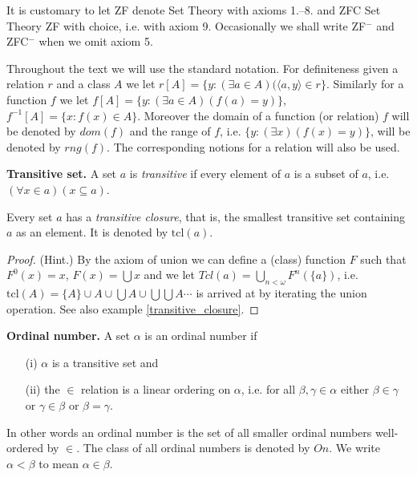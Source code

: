 It is customary to let ZF denote Set Theory with axioms 1.--8. and ZFC Set Theory ZF with choice,
i.e. with axiom 9. Occasionally we shall write ZF$^-$ and ZFC$^-$ when we omit axiom 5.

\begin{notation}
Throughout the text we will use the standard notation. For definiteness given a relation $r$
and a class $A$ we let $r[A]=\{y:(\exists a\in A)(\langle a,y\rangle\in r\}$. Similarly for
a function $f$ we let $f[A]=\{y:(\exists a\in A)(f(a)=y)\}$, $f^{-1}[A]=\{x:f(x)\in A\}$.
Moreover the domain of a function (or relation) $f$ will be denoted by $dom(f)$ and the
range of $f$, i.e. $\{y:(\exists x)(f(x)=y)\}$, will be denoted by $rng(f)$.
The corresponding notions for a relation will also be used.
\end{notation}

\begin{definition}\label{ts}
{\bf Transitive set.} A set $a$ is \emph{transitive} if every element of $a$
 is a subset of $a$, i.e. $(\forall x\in a)(x\subseteq a)$.
\end{definition}

\begin{fact} Every set $a$ has a \emph{transitive closure}, that is, the smallest transitive
 set containing $a$ as an element. It is denoted by $\mbox{tcl}(a)$.
\end{fact}
\begin{proof} (Hint.) By the axiom of union we can define a (class) function $F$ such that
$F^0(x)=x$, $F(x)=\bigcup x$ and we let $Tcl(a)=\bigcup_{n<\omega} F^n(\{a\})$, i.e.
$\mbox{tcl}(A)=\{A\}\cup A\cup \bigcup A\cup \bigcup\bigcup A\cdots$ is arrived at by iterating
the union operation. See also example \ref{transitive_closure}.
\end{proof}

\begin{definition}\label{ordnumber}{\bf Ordinal number.} A set $\alpha$ is an ordinal number if
 \begin{itemize}
  \item[(i)] $\alpha$ is a transitive set and
  \item[(ii)] the $\in$ relation is a linear ordering on $\alpha$, i.e. for all $\beta,\gamma\in\alpha$
               either $\beta\in\gamma$ or $\gamma\in\beta$ or $\beta=\gamma$.
 \end{itemize}
 In other words an ordinal number is the set of all smaller ordinal numbers well-ordered by $\in$.
 The class of all ordinal numbers is denoted by $On$. We write $\alpha<\beta$ to mean $\alpha\in\beta$.
\end{definition}

